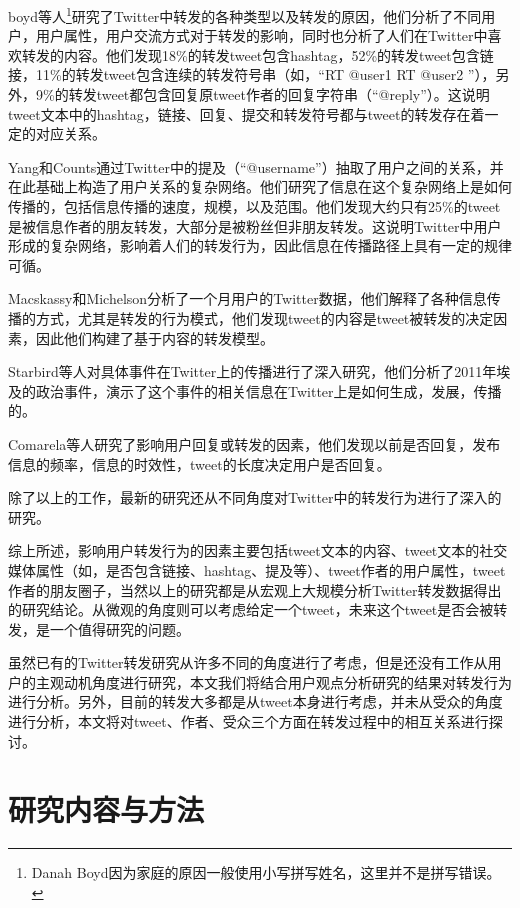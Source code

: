 boyd等人\footnote{Danah Boyd因为家庭的原因一般使用小写拼写姓名，这里并不是拼写错误。}研究了Twitter中转发的各种类型以及转发的原因，他们分析了不同用户，用户属性，用户交流方式对于转发的影响，同时也分析了人们在Twitter中喜欢转发的内容。他们发现18\%的转发tweet包含hashtag，52\%的转发tweet包含链接，11\%的转发tweet包含连续的转发符号串（如，“RT @user1 RT @user2 ”），另外，9\%的转发tweet都包含回复原tweet作者的回复字符串（“@reply”）。这说明tweet文本中的hashtag，链接、回复、提交和转发符号都与tweet的转发存在着一定的对应关系。

Yang和Counts通过Twitter中的提及（“@username”）抽取了用户之间的关系，并在此基础上构造了用户关系的复杂网络。他们研究了信息在这个复杂网络上是如何传播的，包括信息传播的速度，规模，以及范围。他们发现大约只有25\%的tweet是被信息作者的朋友转发，大部分是被粉丝但非朋友转发。这说明Twitter中用户形成的复杂网络，影响着人们的转发行为，因此信息在传播路径上具有一定的规律可循。

Macskassy和Michelson分析了一个月用户的Twitter数据，他们解释了各种信息传播的方式，尤其是转发的行为模式，他们发现tweet的内容是tweet被转发的决定因素，因此他们构建了基于内容的转发模型。

Starbird等人对具体事件在Twitter上的传播进行了深入研究，他们分析了2011年埃及的政治事件，演示了这个事件的相关信息在Twitter上是如何生成，发展，传播的。

Comarela等人研究了影响用户回复或转发的因素，他们发现以前是否回复，发布信息的频率，信息的时效性，tweet的长度决定用户是否回复。

除了以上的工作，最新的研究还从不同角度对Twitter中的转发行为进行了深入的研究。

综上所述，影响用户转发行为的因素主要包括tweet文本的内容、tweet文本的社交媒体属性（如，是否包含链接、hashtag、提及等）、tweet作者的用户属性，tweet作者的朋友圈子，当然以上的研究都是从宏观上大规模分析Twitter转发数据得出的研究结论。从微观的角度则可以考虑给定一个tweet，未来这个tweet是否会被转发，是一个值得研究的问题。

虽然已有的Twitter转发研究从许多不同的角度进行了考虑，但是还没有工作从用户的主观动机角度进行研究，本文我们将结合用户观点分析研究的结果对转发行为进行分析。另外，目前的转发大多都是从tweet本身进行考虑，并未从受众的角度进行分析，本文将对tweet、作者、受众三个方面在转发过程中的相互关系进行探讨。

\section{研究内容与方法}

